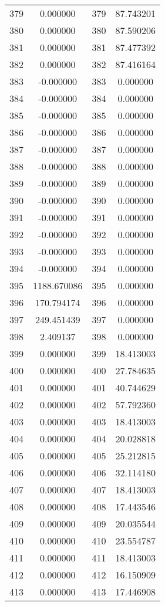 \documentclass[12pt]{article}
\begin{document}
\begin{longtable}{@{}cccc@{}}
379 & 0.000000 & 379 & 87.743201 \\
380 & 0.000000 & 380 & 87.590206 \\
381 & 0.000000 & 381 & 87.477392 \\
382 & 0.000000 & 382 & 87.416164 \\
383 & -0.000000 & 383 & 0.000000 \\
384 & -0.000000 & 384 & 0.000000 \\
385 & -0.000000 & 385 & 0.000000 \\
386 & -0.000000 & 386 & 0.000000 \\
387 & -0.000000 & 387 & 0.000000 \\
388 & -0.000000 & 388 & 0.000000 \\
389 & -0.000000 & 389 & 0.000000 \\
390 & -0.000000 & 390 & 0.000000 \\
391 & -0.000000 & 391 & 0.000000 \\
392 & -0.000000 & 392 & 0.000000 \\
393 & -0.000000 & 393 & 0.000000 \\
394 & -0.000000 & 394 & 0.000000 \\
395 & 1188.670086 & 395 & 0.000000 \\
396 & 170.794174 & 396 & 0.000000 \\
397 & 249.451439 & 397 & 0.000000 \\
398 & 2.409137 & 398 & 0.000000 \\
399 & 0.000000 & 399 & 18.413003 \\
400 & 0.000000 & 400 & 27.784635 \\
401 & 0.000000 & 401 & 40.744629 \\
402 & 0.000000 & 402 & 57.792360 \\
403 & 0.000000 & 403 & 18.413003 \\
404 & 0.000000 & 404 & 20.028818 \\
405 & 0.000000 & 405 & 25.212815 \\
406 & 0.000000 & 406 & 32.114180 \\
407 & 0.000000 & 407 & 18.413003 \\
408 & 0.000000 & 408 & 17.443546 \\
409 & 0.000000 & 409 & 20.035544 \\
410 & 0.000000 & 410 & 23.554787 \\
411 & 0.000000 & 411 & 18.413003 \\
412 & 0.000000 & 412 & 16.150909 \\
413 & 0.000000 & 413 & 17.446908 \\

\end{longtable}
\end{document}
